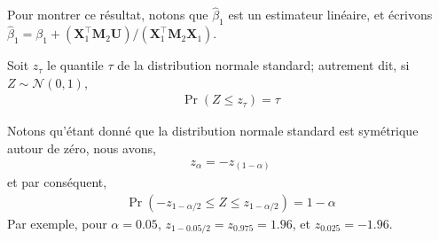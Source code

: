 \begin{frame}[allowframebreaks]
Pour montrer ce résultat, notons que $\widehat{\beta}_1$ est un estimateur linéaire, et écrivons $\widehat{\beta}_1 = \beta_1 + (\mathbf{X}_1^\top\mathbf{M}_2\mathbf{U}) / (\mathbf{X}_1^\top\mathbf{M}_2\mathbf{X}_1)$.

Soit $z_\tau$ le quantile $\tau$ de la distribution normale standard; autrement dit, si $Z\sim \mathcal{N}(0,1)$,
\begin{align*}
\Pr(Z \leq z_\tau) = \tau
\end{align*}

Notons qu'étant donné que la distribution normale standard est symétrique autour de zéro, nous avons,
\begin{align*}
z_\alpha = -z_{(1-\alpha)}
\end{align*}
et par conséquent,
\begin{align*}
\Pr(-z_{1 - \alpha/2}\leq Z\leq z_{1-\alpha/2}) = 1-\alpha
\end{align*}
Par exemple, pour $\alpha=0.05$, $z_{1 - 0.05/2} = z_{0.975} = 1.96$, et $z_{0.025} = -1.96$.
\end{frame}

